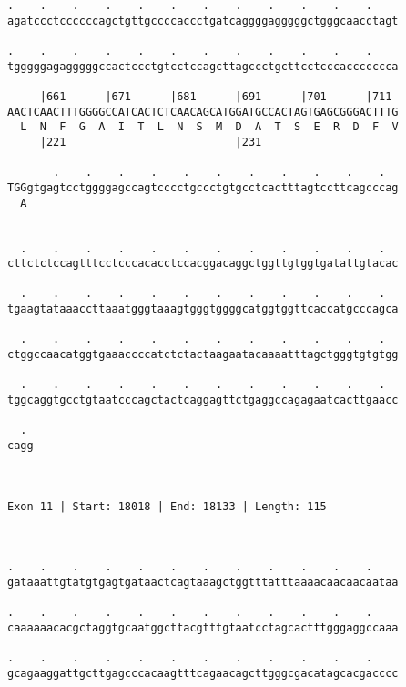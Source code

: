 \documentclass{article}
\begin{document}
\begin{Verbatim}
.    .    .    .    .    .    .    .    .    .    .    .    
agatccctccccccagctgttgccccaccctgatcaggggagggggctgggcaacctagt
                                                            
.    .    .    .    .    .    .    .    .    .    .    .    
tgggggagagggggccactccctgtcctccagcttagccctgcttcctcccaccccccca
                                                            
     |661      |671      |681      |691      |701      |711 
AACTCAACTTTGGGGCCATCACTCTCAACAGCATGGATGCCACTAGTGAGCGGGACTTTG
  L  N  F  G  A  I  T  L  N  S  M  D  A  T  S  E  R  D  F  V
     |221                          |231                     
  
       .    .    .    .    .    .    .    .    .    .    .  
TGGgtgagtcctggggagccagtcccctgccctgtgcctcactttagtccttcagcccag
  A                                                         
                                                            
  
  .    .    .    .    .    .    .    .    .    .    .    .  
cttctctccagtttcctcccacacctccacggacaggctggttgtggtgatattgtacac
                                                            
  .    .    .    .    .    .    .    .    .    .    .    .  
tgaagtataaaccttaaatgggtaaagtgggtggggcatggtggttcaccatgcccagca
                                                            
  .    .    .    .    .    .    .    .    .    .    .    .  
ctggccaacatggtgaaaccccatctctactaagaatacaaaatttagctgggtgtgtgg
                                                            
  .    .    .    .    .    .    .    .    .    .    .    .  
tggcaggtgcctgtaatcccagctactcaggagttctgaggccagagaatcacttgaacc
                                                            
  . 
cagg
    
    
 
Exon 11 | Start: 18018 | End: 18133 | Length: 115



.    .    .    .    .    .    .    .    .    .    .    .    
gataaattgtatgtgagtgataactcagtaaagctggtttatttaaaacaacaacaataa
                                                            
.    .    .    .    .    .    .    .    .    .    .    .    
caaaaaacacgctaggtgcaatggcttacgtttgtaatcctagcactttgggaggccaaa
                                                            
.    .    .    .    .    .    .    .    .    .    .    .    
gcagaaggattgcttgagcccacaagtttcagaacagcttgggcgacatagcacgacccc
                                                            

\end{Verbatim}
\end{document}
